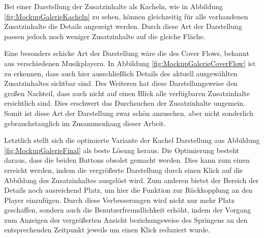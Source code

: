 
Bei einer Darstellung der Zusatzinhalte als Kacheln, wie in Abbildung \ref{fig:MockupGalerieKacheln} zu sehen, können gleichzeitig für alle vorhandenen Zusatzinhalte die Details angezeigt werden. Durch diese Art der Darstellung passen jedoch noch weniger Zusatzinhalte auf die gleiche Fläche.


Eine besonders schicke Art der Darstellung wäre die des Cover Flows, bekannt aus verschiedenen Musikplayern. In Abbildung \ref{fig:MockupGalerieCoverFlow} ist zu erkennen, dass auch hier ausschließlich Details des aktuell ausgewählten Zusatzinhaltes sichtbar sind. Des Weiteren hat diese Darstellungsweise den großen Nachteil, dass auch nicht auf einen Blick alle verfügbaren Zusatzinhalte ersichtlich sind. Dies erschwert das Durchsuchen der Zusatzinhalte ungemein. Somit ist diese Art der Darstellung zwar schön anzusehen, aber nicht sonderlich gebrauchstauglich im Zusammenhang dieser Arbeit.


Letztlich stellt sich die optimierte Variante der Kachel Darstellung aus Abbildung \ref{fig:MockupGalerieFinal} als beste Lösung heraus. Die Optimierung besteht daraus, dass die beiden Buttons obsolet gemacht werden. Dies kann zum einen erreicht werden, indem die vergrößerte Darstellung durch einen Klick auf die Abbildung des Zusatzinhaltes ausgelöst wird. Zum anderen bietet der Bereich der Details noch ausreichend Platz, um hier die Funktion zur Rückkopplung an den Player einzufügen. Durch diese Verbesserungen wird nicht nur mehr Platz geschaffen, sondern auch die Benutzerfreundlichkeit erhöht, indem der Vorgang zum Anzeigen der vergrößerten Ansicht beziehungsweise des Springens an den entsprechenden Zeitpunkt jeweils um einen Klick reduziert wurde.

